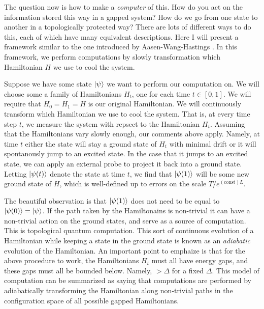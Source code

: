\documentclass{article}
\theoremstyle{definition}
\newcommand{\0}{\left|0\right>}
\newcommand{\1}{\left|1\right>}
\numberwithin{figure}{section}
\begin{document}
The question now is how to make a \textit{computer} of this. How do you act on the information stored this way in a gapped system? How do we go from one state to another in a topologically protected way? There are lots of different ways to do this, each of which have many equivalent descriptions. Here I will present a framework similar to the one introduced by Aasen-Wang-Hastings \cite{aasen2022adiabatic}. In this framework, we perform computations by slowly transformation which Hamiltonian $H$ we use to cool the system.

Suppose we have some state $\ket{\psi}$ we want to perform our computation on. We will choose some a family of Hamiltonians $H_t$, one for each time $t\in [0,1]$. We will require that $H_0=H_1=H$ is our original Hamiltonian. We will continuously transform which Hamiltonian we use to cool the system. That is, at every time step $t$, we measure the system with repsect to the Hamiltonian $H_t$. Assuming that the Hamiltonians vary slowly enough, our comments above apply. Namely, at time $t$ either the state will stay a ground state of $H_t$ with minimal drift or it will spontanously jump to an excited state. In the case that it jumps to an excited state, we can apply an external probe to project it back into a ground state. Letting $\ket{\psi(t)}$ denote the state at time $t$, we find that $\ket{\psi(1)}$ will be some new ground state of $H$, which is well-defined up to errors on the scale $T/e^{(\text{const})L}$.

The beautiful observation is that $\ket{\psi(1)}$ does not need to be equal to $\ket{\psi(0)}=\ket{\psi}$. If the path taken by the Hamiltonains is non-trivial it can have a non-trivial action on the ground states, and serve as a source of computation. This is topological quantum computation. This sort of continuous evolution of a Hamiltonian while keeping a state in the ground state is known as an \textit{adiabatic} evolution of the Hamiltonian. An important point to emphaize is that for the above procedure to work, the Hamiltonians $H_t$ must all have energy gaps, and these gaps must all be bounded below. Namely, $>\Delta$ for a fixed $\Delta$. This model of computation can be summarized as saying that computations are performed by adiabatically transforming the Hamiltonian along non-trivial paths in the configuration space of all possible gapped Hamiltonians.
\end{document}
